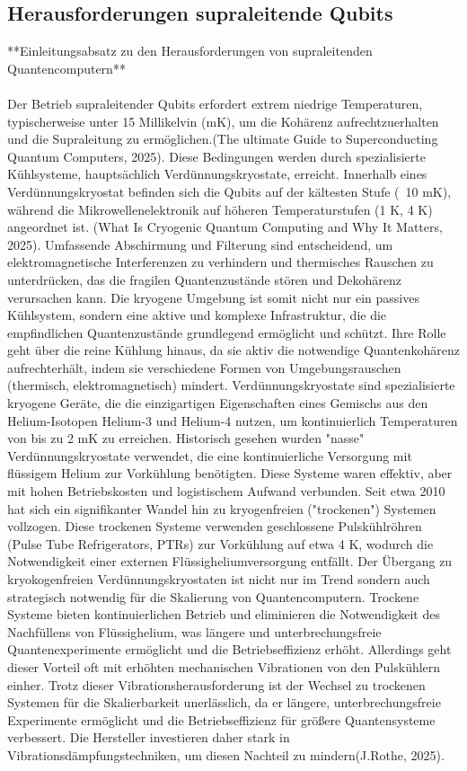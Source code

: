 \subsection{Herausforderungen supraleitende Qubits}
**Einleitungsabsatz zu den Herausforderungen von supraleitenden Quantencomputern**
\\\\
Der Betrieb supraleitender Qubits erfordert extrem niedrige Temperaturen, typischerweise unter 15 Millikelvin (mK), um die Kohärenz aufrechtzuerhalten und die Supraleitung zu ermöglichen.(The ultimate Guide to Superconducting Quantum Computers, 2025). Diese Bedingungen werden durch spezialisierte Kühlsysteme, hauptsächlich Verdünnungskryostate, erreicht. Innerhalb eines Verdünnungskryostat befinden sich die Qubits auf der kältesten Stufe (~10 mK), während die Mikrowellenelektronik auf höheren Temperaturstufen (1 K, 4 K) angeordnet ist. (What Is Cryogenic Quantum Computing and Why It Matters, 2025). Umfassende Abschirmung und Filterung sind entscheidend, um elektromagnetische Interferenzen zu verhindern und thermisches Rauschen zu unterdrücken, das die fragilen Quantenzustände stören und Dekohärenz verursachen kann. Die kryogene Umgebung ist somit nicht nur ein passives Kühlsystem, sondern eine aktive und komplexe Infrastruktur, die die empfindlichen Quantenzustände grundlegend ermöglicht und schützt. Ihre Rolle geht über die reine Kühlung hinaus, da sie aktiv die notwendige Quantenkohärenz aufrechterhält, indem sie verschiedene Formen von Umgebungsrauschen (thermisch, elektromagnetisch) mindert. Verdünnungskryostate sind spezialisierte kryogene Geräte, die die einzigartigen Eigenschaften eines Gemischs aus den Helium-Isotopen Helium-3 und Helium-4 nutzen, um kontinuierlich Temperaturen von bis zu 2 mK zu erreichen. Historisch gesehen wurden "nasse" Verdünnungskryostate verwendet, die eine kontinuierliche Versorgung mit flüssigem Helium zur Vorkühlung benötigten. Diese Systeme waren effektiv, aber mit hohen Betriebskosten und logistischem Aufwand verbunden. Seit etwa 2010 hat sich ein signifikanter Wandel hin zu kryogenfreien ("trockenen") Systemen vollzogen. Diese trockenen Systeme verwenden geschlossene Pulskühlröhren (Pulse Tube Refrigerators, PTRs) zur Vorkühlung auf etwa 4 K, wodurch die Notwendigkeit einer externen Flüssigheliumversorgung entfällt. Der Übergang zu kryokogenfreien Verdünnungskryostaten ist nicht nur im Trend sondern auch strategisch notwendig für die Skalierung von Quantencomputern. Trockene Systeme bieten kontinuierlichen Betrieb und eliminieren die Notwendigkeit des Nachfüllens von Flüssighelium, was längere und unterbrechungsfreie Quantenexperimente ermöglicht und die Betriebseffizienz erhöht. Allerdings geht dieser Vorteil oft mit erhöhten mechanischen Vibrationen von den Pulskühlern einher. Trotz dieser Vibrationsherausforderung ist der Wechsel zu trockenen Systemen für die Skalierbarkeit unerlässlich, da er längere, unterbrechungsfreie Experimente ermöglicht und die Betriebseffizienz für größere Quantensysteme verbessert. Die Hersteller investieren daher stark in Vibrationsdämpfungstechniken, um diesen Nachteil zu mindern(J.Rothe, 2025).
